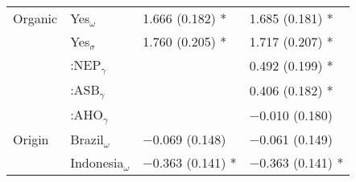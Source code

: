\documentclass[sustainability,article,accept,moreauthors,pdftex,10pt,a4paper]{Definitions/mdpi}
\theoremstyle{mdpi}
\theoremstyle{mdpidefinition}
\begin{document}
{{\begin{table}[H]
\begin{tabular}{p{2cm}p{3.5cm} p{3cm} p{3cm}}
\midrule
Organic& Yes$_\omega$ &                  1.666 (0.182) *               & 1.685 (0.181) *               \\ %
& Yes$_\sigma$ &                 1.760 (0.205) *               & 1.717 (0.207) *               \\ %
& :NEP$_\gamma$ &                                             & 0.492 (0.199) *               \\ %
& :ASB$_\gamma$  &                                            & 0.406 (0.182) *              \\ %
& :AHO$_\gamma$ &                                             & $-$0.010 (0.180)               \\ %
\midrule
Origin & Brazil$_\omega$ &                       $-$0.069 (0.148)               & $-$0.061 (0.149)               \\ %
& Indonesia$_\omega$ &                    $-$0.363 (0.141) *              & $-$0.363 (0.141) *              \\ %

\end{tabular}
\end{table}}}
\end{document}
